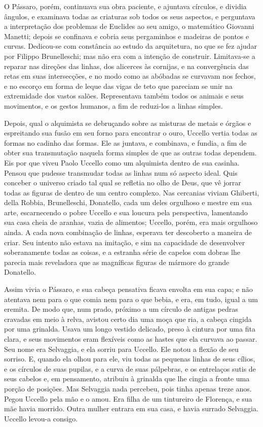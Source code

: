 O Pássaro, porém, continuava sua obra paciente, e ajuntava círculos, e
dividia ângulos, e examinava todas as criaturas sob todos os seus
aspectos, e perguntava a interpretação dos problemas de Euclides ao seu
amigo, o matemático Giovanni Manetti; depois se confinava e cobria seus
pergaminhos e madeiras de pontos e curvas. Dedicou-se com constância ao
estudo da arquitetura, no que se fez ajudar por Filippo Brunelleschi; mas
não era com a intenção de construir. Limitava-se a reparar nas direções
das linhas, dos alicerces às cornijas, e na convergência das retas em suas
intersecções, e no modo como as abóbadas se curvavam nos fechos, e no
escorço em forma de leque das vigas de teto que pareciam se unir na
extremidade dos vastos salões. Representava também todos os animais e seus
movimentos, e os gestos humanos, a fim de reduzi-los a linhas simples.

Depois, qual o alquimista se debruçando sobre as misturas de metais e
órgãos e espreitando sua fusão em seu forno para encontrar o ouro, Uccello
vertia todas as formas no cadinho das formas. Ele as juntava, e combinava,
e fundia, a fim de obter sua transmutação naquela forma simples de que as
outras todas dependem. Eis por que viveu Paolo Uccello como um alquimista
dentro de sua casinha. Pensou que pudesse transmudar todas as linhas num
só aspecto ideal. Quis conceber o universo criado tal qual se refletia no
olho de Deus, que vê jorrar todas as figuras de dentro de um centro
complexo. Nas cercanias viviam Ghiberti, della Robbia, Brunelleschi,
Donatello, cada um deles orgulhoso e mestre em sua arte, escarnecendo o
pobre Uccello e sua loucura pela perspectiva, lamentando sua casa cheia de
aranhas, vazia de alimentos; Uccello, porém, era mais orgulhoso ainda. A
cada nova combinação de linhas, esperava ter descoberto a maneira de
criar. Seu intento não estava na imitação, e sim na capacidade de
desenvolver soberanamente todas as coisas, e a estranha série de capelos
com dobras lhe parecia mais reveladora que as magníficas figuras de
mármore do grande Donatello.

Assim vivia o Pássaro, e sua cabeça pensativa ficava envolta em sua capa; e
não atentava nem para o que comia nem para o que bebia, e era, em tudo,
igual a um eremita. De modo que, num prado, próximo a um círculo de
antigas pedras cravadas em meio à relva, avistou certo dia uma moça que
ria, a cabeça cingida por uma grinalda. Usava um longo vestido delicado,
preso à cintura por uma fita clara, e seus movimentos eram flexíveis como
as hastes que ela curvava ao passar. Seu nome era Selvaggia, e ela sorriu
para Uccello. Ele notou a flexão de seu sorriso. E, quando ela olhou para
ele, viu todas as pequenas linhas de seus cílios, e os círculos de suas
pupilas, e a curva de suas pálpebras, e os entrelaços sutis de seus
cabelos e, em pensamento, atribuiu à grinalda que lhe cingia a fronte uma
porção de posições. Mas Selvaggia nada percebeu, pois tinha apenas treze
anos. Pegou Uccello pela mão e o amou. Era filha de um tintureiro de
Florença, e sua mãe havia morrido. Outra mulher entrara em sua casa, e
havia surrado Selvaggia. Uccello levou-a consigo.

